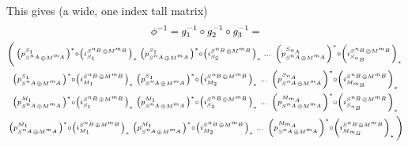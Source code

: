 \begin{remark}
    This gives (a wide, one index tall matrix)
    \begin{multline*}
        \phi^{-1} =  g_1^{-1} \circ g_2^{-1} \circ g_3^{-1} = \\
        \biggl(
            \begin{smallmatrix}
                \left(  p_{S^{n_A} \oplus M^{m_A}}^{S_1}  \right)^* \circ \left(  i_{S_1}^{S^{n_B} \oplus M^{m_B}}  \right)_* &
                \left(  p_{S^{n_A} \oplus M^{m_A}}^{S_1}  \right)^* \circ \left(  i_{S_2}^{S^{n_B} \oplus M^{m_B}}  \right)_* &
                \dots &
                \left(  p_{S^{n_A} \oplus M^{m_A}}^{S_{n_A}}  \right)^* \circ \left(  i_{S_{n_B}}^{S^{n_B} \oplus M^{m_B}}  \right)_*
            \end{smallmatrix}
            \\
            \begin{smallmatrix}
                \left(  p_{S^{n_A} \oplus M^{m_A}}^{S_1}  \right)^* \circ \left(  i_{M_1}^{S^{n_B} \oplus M^{m_B}}  \right)_* &
                \left(  p_{S^{n_A} \oplus M^{m_A}}^{S_1}  \right)^* \circ \left(  i_{M_2}^{S^{n_B} \oplus M^{m_B}}  \right)_* &
                \dots &
                \left(  p_{S^{n_A} \oplus M^{m_A}}^{S_{n_A}}  \right)^* \circ \left(  i_{M_{m_B}}^{S^{n_B} \oplus M^{m_B}}  \right)_*
            \end{smallmatrix}
            \\
            \begin{smallmatrix}
                \left(  p_{S^{n_A} \oplus M^{m_A}}^{M_1}  \right)^* \circ \left(  i_{S_1}^{S^{n_B} \oplus M^{m_B}}  \right)_* &
                \left(  p_{S^{n_A} \oplus M^{m_A}}^{M_1}  \right)^* \circ \left(  i_{S_2}^{S^{n_B} \oplus M^{m_B}}  \right)_* &
                \dots &
                \left(  p_{S^{n_A} \oplus M^{m_A}}^{M_{m_A}}  \right)^* \circ \left(  i_{S_{n_B}}^{S^{n_B} \oplus M^{m_B}}  \right)_*
            \end{smallmatrix}
            \\
            \begin{smallmatrix}
                \left(  p_{S^{n_A} \oplus M^{m_A}}^{M_1}  \right)^* \circ \left(  i_{M_1}^{S^{n_B} \oplus M^{m_B}}  \right)_* &
                \left(  p_{S^{n_A} \oplus M^{m_A}}^{M_1}  \right)^* \circ \left(  i_{M_2}^{S^{n_B} \oplus M^{m_B}}  \right)_* &
                \dots &
                \left(  p_{S^{n_A} \oplus M^{m_A}}^{M_{m_A}}  \right)^* \circ \left(  i_{M_{m_B}}^{S^{n_B} \oplus M^{m_B}}  \right)_*
            \end{smallmatrix}
        \biggr)
    \end{multline*}
\end{remark}

